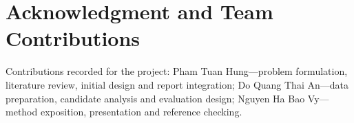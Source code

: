 \documentclass{article}
\begin{document}
\begin{minipage}{\columnwidth}
\section*{Acknowledgment and Team Contributions}
Contributions recorded for the project: Pham Tuan Hung---problem formulation, literature review, initial design and report integration; Do Quang Thai An---data preparation, candidate analysis and evaluation design; Nguyen Ha Bao Vy---method exposition, presentation and reference checking.
\end{minipage}



\end{document}
